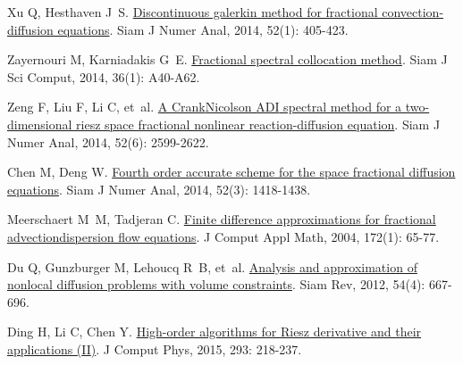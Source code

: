 \begin{thebibliography}{77}
    Xu Q, Hesthaven J~S.
    \newblock \href{https://doi.org/10.1137/130918174}{Discontinuous galerkin method for fractional convection-diffusion equations}\allowbreak[J].
    \newblock Siam J Numer Anal, 2014, 52\allowbreak (1): 405-423.
    
    Zayernouri M, Karniadakis G~E.
    \newblock \href{https://doi.org/10.1137/130933216}{Fractional spectral collocation method}\allowbreak[J].
    \newblock Siam J Sci Comput, 2014, 36\allowbreak (1): A40-A62.
    
    Zeng F, Liu F, Li C, et~al.
    \newblock \href{https://doi.org/10.1137/130934192}{A {{Crank}}{\textendash}{{Nicolson ADI}} spectral method for a two-dimensional riesz space fractional nonlinear reaction-diffusion equation}\allowbreak[J].
    \newblock Siam J Numer Anal, 2014, 52\allowbreak (6): 2599-2622.
    
    Chen M, Deng W.
    \newblock \href{https://doi.org/10.1137/130933447}{Fourth order accurate scheme for the space fractional diffusion equations}\allowbreak[J].
    \newblock Siam J Numer Anal, 2014, 52\allowbreak (3): 1418-1438.
    
    Meerschaert M~M, Tadjeran C.
    \newblock \href{https://www.sciencedirect.com/science/article/pii/S0377042704000986}{Finite difference approximations for fractional advection{\textendash}dispersion flow equations}\allowbreak[J].
    \newblock J Comput Appl Math, 2004, 172\allowbreak (1): 65-77.
    
    Du Q, Gunzburger M, Lehoucq R~B, et~al.
    \newblock \href{https://doi.org/10.1137/110833294}{Analysis and approximation of nonlocal diffusion problems with volume constraints}\allowbreak[J].
    \newblock Siam Rev, 2012, 54\allowbreak (4): 667-696.
    
    Ding H, Li C, Chen Y.
    \newblock \href{https://www.sciencedirect.com/science/article/pii/S0021999114004148}{High-order algorithms for {{Riesz}} derivative and their applications ({{II}})}\allowbreak[J].
    \newblock J Comput Phys, 2015, 293: 218-237.
    

\end{thebibliography}
